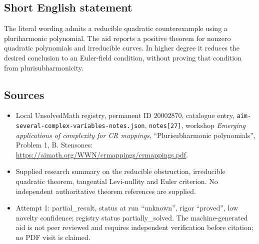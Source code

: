 \documentclass[11pt]{article}
\begin{document}
\subsection{Short English statement}
The literal wording admits a reducible quadratic counterexample using a pluriharmonic polynomial. The aid reports a positive theorem for nonzero quadratic polynomials and irreducible curves. In higher degree it reduces the desired conclusion to an Euler-field condition, without proving that condition from plurisubharmonicity.
\subsection{Sources}
\begin{itemize}
\item Local UnsolvedMath registry, permanent ID \(20002870\), catalogue entry, \texttt{aim-several-complex-variables-notes.json}, \texttt{notes[27]}, workshop \emph{Emerging applications of complexity for CR mappings}, ``Plurisubharmonic polynomials'', Problem 1, B. Stensones: \url{https://aimath.org/WWN/crmappings/crmappings.pdf}.
\item Supplied research summary on the reducible obstruction, irreducible quadratic theorem, tangential Levi-nullity and Euler criterion. No independent authoritative theorem references are supplied.
\item Attempt 1: partial\_result, status at run ``unknown'', rigor ``proved'', low novelty confidence; registry status partially\_solved. The machine-generated aid is not peer reviewed and requires independent verification before citation; no PDF visit is claimed.
\end{itemize}
\end{document}
